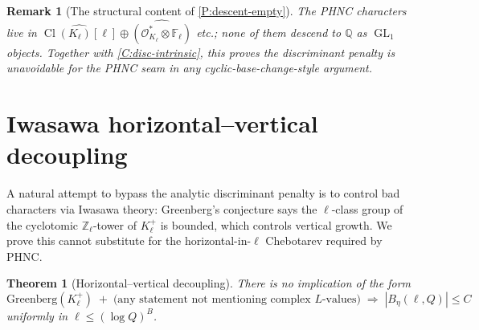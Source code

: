 \documentclass[11pt]{article}
\newtheorem{theorem}{Theorem}
\newtheorem{remark}{Remark}
\newcommand{\Z}{\mathbb Z}
\newcommand{\Q}{\mathbb Q}
\newcommand{\F}{\mathbb F}
\newcommand{\Cl}{\operatorname{Cl}}
\newcommand{\GL}{\operatorname{GL}}
\begin{document}
\begin{remark}[The structural content of \cref{P:descent-empty}]
The PHNC characters live in \(\widehat{\Cl(K_\ell)[\ell]}\oplus\widehat{(\mathcal O_{K_\ell}^*\otimes\F_\ell)}\) etc.; none of them descend to \(\Q\) as \(\GL_1\) objects.  Together with \cref{C:disc-intrinsic}, this proves the discriminant penalty is unavoidable for the PHNC seam in any cyclic-base-change-style argument.
\end{remark}

\section{Iwasawa horizontal--vertical decoupling}

A natural attempt to bypass the analytic discriminant penalty is to control bad characters via Iwasawa theory: Greenberg's conjecture says the \(\ell\)-class group of the cyclotomic \(\Z_\ell\)-tower of \(K_\ell^+\) is bounded, which controls vertical growth.  We prove this cannot substitute for the horizontal-in-\(\ell\) Chebotarev required by PHNC.

\begin{theorem}[Horizontal--vertical decoupling]\label{T:iwasawa-decoupling}
There is no implication of the form
\[
\mathrm{Greenberg}(K_\ell^+)\;+\;\text{(any statement not mentioning complex }L\text{-values)}\;\Longrightarrow\;|B_\eta(\ell,Q)|\le C
\]
uniformly in \(\ell\le(\log Q)^B\).
\end{theorem}
\end{document}
